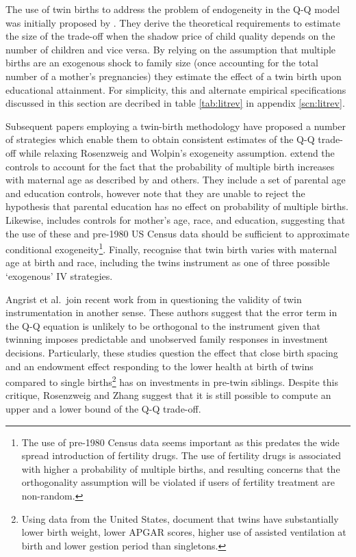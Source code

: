 The use of twin births to address the problem of endogeneity in the Q-Q model was initially proposed by \citet{RosenzweigWolpin1980}.  They derive the theoretical requirements to estimate the size of the trade-off when the shadow price of child quality depends on the number of children and vice versa.  By relying on the assumption that multiple births are an exogenous shock to family size (once accounting for the total number of a mother's pregnancies) they estimate the effect of a twin birth upon educational attainment.  For simplicity, this and alternate empirical specifications discussed in this section are decribed in table \ref{tab:litrev} in appendix \ref{scn:litrev}.  

Subsequent papers employing a twin-birth methodology have proposed a number of strategies which enable them to obtain consistent estimates of the Q-Q trade-off while relaxing Rosenzweig and Wolpin's exogeneity assumption.  \citet{Blacketal2005} extend the controls to account for the fact that the probability of multiple birth increases with maternal age as described by \citet{Jacobsenetal1999} and others.  They include a set of parental age and education controls, however note that they are unable to reject the hypothesis that parental education has no effect on probability of multiple births.  Likewise, \citet{Caceres2006} includes controls for mother's age, race, and education, suggesting that the use of these and pre-1980 US Census data should be sufficient to approximate conditional exogeneity\footnote{The use of pre-1980 Census data seems important as this predates the wide spread introduction of fertility drugs.  The use of fertility drugs is associated with higher a probability of multiple births, and resulting concerns that the orthogonality assumption will be violated if users of fertility treatment are non-random.}.  Finally, \citet{Angristetal2010} recognise that twin birth varies with maternal age at birth and race, including the twins instrument as one of three possible `exogenous' IV strategies. 

Angrist et al.\ join recent work from \citet{RosenzweigZhang2009} in questioning the validity of twin instrumentation in another sense.  These authors suggest that the error term in the Q-Q equation is unlikely to be orthogonal to the instrument given that twinning imposes predictable and unobserved family responses in investment decisions.  Particularly, these studies question the effect that close birth spacing and an endowment effect responding to the lower health at birth of twins compared to single births\footnote{Using data from the United States, \citet{Almondetal2005} document that twins have substantially lower birth weight, lower APGAR scores, higher use of assisted ventilation at birth and lower gestion period than singletons.} has on investments in pre-twin siblings.  Despite this critique, Rosenzweig and Zhang suggest that it is still possible to compute an upper and a lower bound of the Q-Q trade-off.

